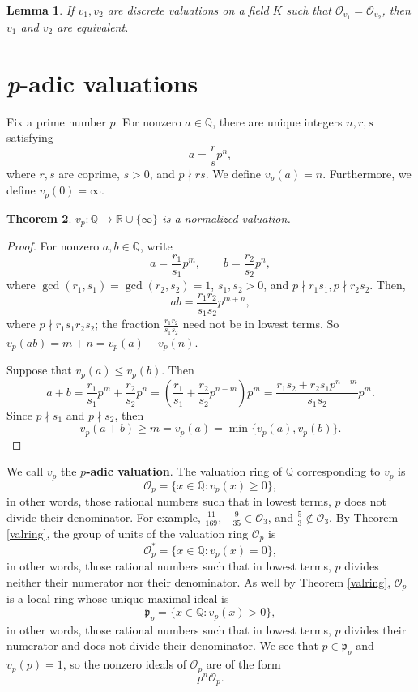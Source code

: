 \documentclass{article}
\theoremstyle{plain}
\newtheorem{theorem}{Theorem}
\newtheorem{lemma}[theorem]{Lemma}
\theoremstyle{definition}
\begin{document}
\begin{lemma}
If $v_1,v_2$ are discrete valuations on a field $K$ such that $\mathcal{O}_{v_1}=\mathcal{O}_{v_2}$, then 
$v_1$ and $v_2$ are equivalent. 
\end{lemma}


\section{{\em p}-adic valuations}
Fix a prime number $p$. For nonzero $a \in \mathbb{Q}$, there are unique integers $n,r,s$ satisfying
\[
a=\frac{r}{s}p^n,
\]
where $r,s$ are coprime, $s>0$, and $p \nmid rs$. 
We define $v_p(a)=n$. 
Furthermore, we define $v_p(0)=\infty$. 


\begin{theorem}
$v_p:\mathbb{Q} \to \mathbb{R} \cup \{\infty\}$ is a normalized valuation.
\end{theorem}
\begin{proof}
For nonzero $a,b \in \mathbb{Q}$,
write
\[
a=\frac{r_1}{s_1} p^m, \qquad b = \frac{r_2}{s_2}p^n,
\]
where $\gcd(r_1,s_1)=\gcd(r_2,s_2)=1$, $s_1,s_2>0$, and $p
\nmid r_1s_1, p \nmid r_2s_2$. Then,
\[
ab = \frac{r_1r_2}{s_1s_2} p^{m+n},
\]
where $p \nmid r_1s_1r_2s_2$; the fraction $\frac{r_1r_2}{s_1s_2}$ need not be in lowest terms. 
So $v_p(ab)=m+n=v_p(a)+v_p(n)$.

Suppose that $v_p(a) \leq   v_p(b)$. Then
\[
a+b = \frac{r_1}{s_1} p^m +  \frac{r_2}{s_2}p^n
= \left( \frac{r_1}{s_1} +\frac{r_2}{s_2} p^{n-m}\right)p^m
=\frac{r_1s_2+r_2s_1p^{n-m}}{s_1s_2} p^m.
\]
Since $p \nmid s_1$ and $p \nmid s_2$, 
then
\[
v_p(a+b) \geq m = v_p(a) = \min\{v_p(a),v_p(b)\}.
\]
\end{proof}

We call $v_p$ the \textbf{$p$-adic valuation}.
The valuation ring of $\mathbb{Q}$ corresponding to  $v_p$ is
\[
\mathcal{O}_p = \{x \in \mathbb{Q}: v_p(x) \geq 0\}, 
\]
in other words, those rational numbers such that in lowest terms, $p$ does not divide their denominator. For example,
$\frac{11}{169}, -\frac{9}{35} \in \mathcal{O}_3$, and $\frac{5}{3} \not \in \mathcal{O}_3$. 
By Theorem \ref{valring}, the group of units of the valuation ring $\mathcal{O}_p$ is
\[
\mathcal{O}_p^*= \{x \in \mathbb{Q}: v_p(x)=0\},
\]
in other words, those rational numbers such that in lowest terms, $p$ divides neither their numerator nor their denominator. 
As well by Theorem \ref{valring}, $\mathcal{O}_p$ is a local ring whose unique maximal ideal is
\[
\mathfrak{p}_p = \{x \in \mathbb{Q}: v_p(x)>0\},
\]
in other words, those rational numbers such that in lowest terms, $p$ divides their numerator and does not divide their
denominator. 
We see that $p \in \mathfrak{p}_p$ and $v_p(p)=1$, so the nonzero ideals of $\mathcal{O}_p$ are of the form
\[
p^n \mathcal{O}_p.
\]
\end{document}
